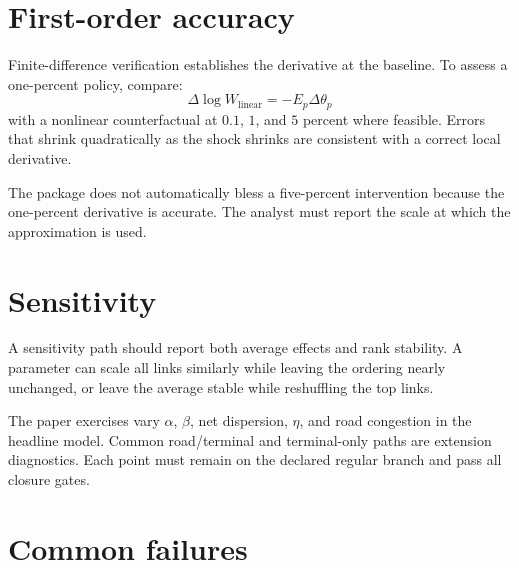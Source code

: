 \section{First-order accuracy}

Finite-difference verification establishes the derivative at the baseline. To
assess a one-percent policy, compare:
\[
 \Delta\log W_{\mathrm{linear}}=-E_p\Delta\theta_p
\]
with a nonlinear counterfactual at \(0.1\), \(1\), and \(5\) percent where
feasible. Errors that shrink quadratically as the shock shrinks are consistent
with a correct local derivative.

The package does not automatically bless a five-percent intervention because
the one-percent derivative is accurate. The analyst must report the scale at
which the approximation is used.

\section{Sensitivity}

A sensitivity path should report both average effects and rank stability. A
parameter can scale all links similarly while leaving the ordering nearly
unchanged, or leave the average stable while reshuffling the top links.

The paper exercises vary \(\alpha\), \(\beta\), net dispersion, \(\eta\), and
road congestion in the headline model. Common road/terminal and terminal-only
paths are extension diagnostics. Each point must remain on the declared
regular branch and pass all closure gates.

\section{Common failures}

